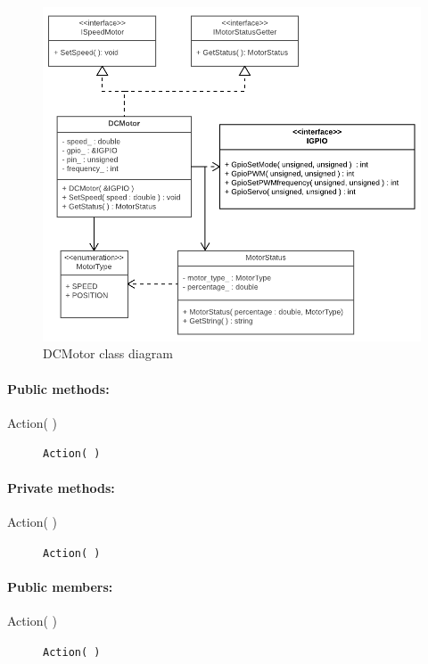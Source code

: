 \begin{figure}[H]
\centering
\includegraphics[width=1\linewidth]{Images/Design/DCMotor_class_diagram}
\caption{DCMotor class diagram}
\label{fig:dcmotor}
\end{figure}

\paragraph{Public methods:}
\begin{adjustwidth}{2.5em}{0pt}\begin{description}
		\item [Action( )] \texttt{Action( )}
\end{description}\end{adjustwidth}

\paragraph{Private methods:}
\begin{adjustwidth}{2.5em}{0pt}\begin{description}
		\item [Action( )] \texttt{Action( )}
\end{description}\end{adjustwidth}

\paragraph{Public members:}
\begin{adjustwidth}{2.5em}{0pt}\begin{description}
		\item [Action( )] \texttt{Action( )} 
\end{description}\end{adjustwidth}

